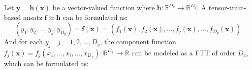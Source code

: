 \documentclass[11pt]{article}
\begin{document}
    Let $\mathbf{y}=\mathbf{h}(\mathbf{x}) $ be a vector-valued function where \cite{Calculus40:online}  $ \mathbf{h}:\mathbb{R}^{D_x} \rightarrow \mathbb{R}^{D_y}$.
    A tensor-train-based ansatz $\mathbf{f} \approx \mathbf{h}$ can be formulated as:
    \begin{equation}
        \label{eq:ftt-overall-formulation}
        (y_1,y_2,\dots,y_{j},y_{D_y}) = \mathbf{f}(\mathbf{x}) = (f_1(\mathbf{x}),f_2(\mathbf{x}),\dots,f_j(\mathbf{x}),\dots,f_{D_y}(\mathbf{x}))
    \end{equation}
    And for each $y_j \quad j=1,2,\dots,D_y$, the component function \cite{Calculus40:online}
    $f_j(\mathbf{x})=f_j(x_1,\dots,x_i,\dots,x_{D_x}): \mathbb{R}^{D_x} \rightarrow \mathbb{R} $
    can be modeled as a FTT of order $D_x$, which can be formulated as:
\end{document}

